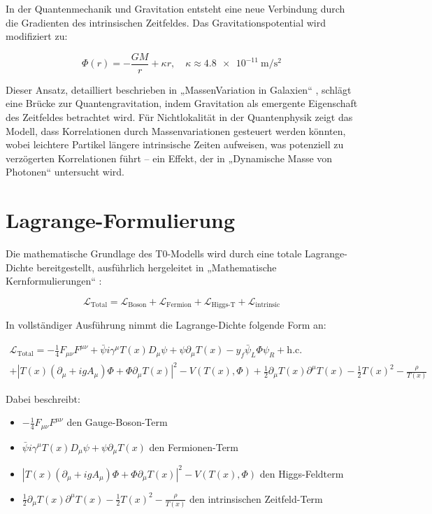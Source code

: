 \documentclass[a4paper,12pt]{article}
\newcommand{\Tfield}{T(x)}
\newcommand{\DcovT}[1]{\Tfield D_\mu #1 + #1 \partial_\mu \Tfield}
\newcommand{\DhiggsT}{\Tfield (\partial_\mu + ig A_\mu) \Phi + \Phi \partial_\mu \Tfield}
\begin{document}
	In der Quantenmechanik und Gravitation entsteht eine neue Verbindung durch die Gradienten des intrinsischen Zeitfeldes. Das Gravitationspotential wird modifiziert zu:
	
	\begin{equation}
		\Phi(r) = -\frac{G M}{r} + \kappa r, \quad \kappa \approx \SI{4.8e-11}{\meter\per\second\squared}
	\end{equation}
	
	Dieser Ansatz, detailliert beschrieben in „MassenVariation in Galaxien“ \cite{pascher_galaxies_2025}, schlägt eine Brücke zur Quantengravitation, indem Gravitation als emergente Eigenschaft des Zeitfeldes betrachtet wird. Für Nichtlokalität in der Quantenphysik zeigt das Modell, dass Korrelationen durch Massenvariationen gesteuert werden könnten, wobei leichtere Partikel längere intrinsische Zeiten aufweisen, was potenziell zu verzögerten Korrelationen führt – ein Effekt, der in „Dynamische Masse von Photonen“ \cite{pascher_photons_2025} untersucht wird.
	
	\section{Lagrange-Formulierung}
	
	Die mathematische Grundlage des T0-Modells wird durch eine totale Lagrange-Dichte bereitgestellt, ausführlich hergeleitet in „Mathematische Kernformulierungen“ \cite{pascher_lagrange_2025}:
	
	\begin{equation}
		\mathcal{L}_{\text{Total}} = \mathcal{L}_{\text{Boson}} + \mathcal{L}_{\text{Fermion}} + \mathcal{L}_{\text{Higgs-T}} + \mathcal{L}_{\text{intrinsic}}
	\end{equation}
	
	In vollständiger Ausführung nimmt die Lagrange-Dichte folgende Form an:
	
	\begin{multline}
		\mathcal{L}_{\text{Total}} = -\frac{1}{4} F_{\mu\nu} F^{\mu\nu} + \bar{\psi} i \gamma^\mu \DcovT{\psi} - y_f \bar{\psi}_L \Phi \psi_R + \text{h.c.} \\
		+ |\DhiggsT|^2 - V(\Tfield, \Phi) + \frac{1}{2} \partial_\mu \Tfield \partial^\mu \Tfield - \frac{1}{2}\Tfield^2 - \frac{\rho}{\Tfield}
	\end{multline}
	
	Dabei beschreibt:
	\begin{itemize}
		\item $-\frac{1}{4} F_{\mu\nu} F^{\mu\nu}$ den Gauge-Boson-Term
		\item $\bar{\psi} i \gamma^\mu \DcovT{\psi}$ den Fermionen-Term
		\item $|\DhiggsT|^2 - V(\Tfield, \Phi)$ den Higgs-Feldterm
		\item $\frac{1}{2} \partial_\mu \Tfield \partial^\mu \Tfield - \frac{1}{2}\Tfield^2 - \frac{\rho}{\Tfield}$ den intrinsischen Zeitfeld-Term
	\end{itemize}
	
\end{document}
